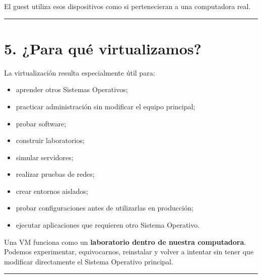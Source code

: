 \documentclass[
  spanish,
  letterpaper,
]{scrbook}
\providecommand{\tightlist}{%
  \setlength{\itemsep}{0pt}\setlength{\parskip}{0pt}}
\begin{document}
El guest utiliza esos dispositivos como si pertenecieran a una
computadora real.

\begin{center}\rule{0.5\linewidth}{0.5pt}\end{center}


\chapter{5. ¿Para qué virtualizamos?}\label{para-quuxe9-virtualizamos}

La virtualización resulta especialmente útil para:

\begin{itemize}
\tightlist
\item
  aprender otros Sistemas Operativos;
\item
  practicar administración sin modificar el equipo principal;
\item
  probar software;
\item
  construir laboratorios;
\item
  simular servidores;
\item
  realizar pruebas de redes;
\item
  crear entornos aislados;
\item
  probar configuraciones antes de utilizarlas en producción;
\item
  ejecutar aplicaciones que requieren otro Sistema Operativo.
\end{itemize}

\begin{tcolorbox}[enhanced jigsaw, arc=.35mm, bottomrule=.15mm, bottomtitle=1mm, breakable, colback=white, colbacktitle=quarto-callout-tip-color!10!white, colframe=quarto-callout-tip-color-frame, coltitle=black, left=2mm, leftrule=.75mm, opacityback=0, opacitybacktitle=0.6, rightrule=.15mm, title=\textcolor{quarto-callout-tip-color}{\faLightbulb}\hspace{0.5em}{En nuestro curso}, titlerule=0mm, toprule=.15mm, toptitle=1mm]

Una VM funciona como un \textbf{laboratorio dentro de nuestra
computadora}. Podemos experimentar, equivocarnos, reinstalar y volver a
intentar sin tener que modificar directamente el Sistema Operativo
principal.

\end{tcolorbox}

\begin{center}\rule{0.5\linewidth}{0.5pt}\end{center}
\end{document}
